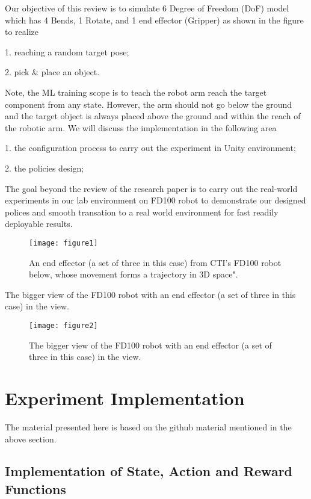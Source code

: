\documentclass[conference]{IEEEtran}
\begin{document}
Our objective of this review is to simulate 
6 Degree of Freedom (DoF) model which has 
4 Bends, 1 Rotate, and 1 end effector (Gripper)
as shown in the figure to realize 

1. reaching a random target pose; 

2. pick \& place an object. 

Note, the ML training scope is to teach the robot arm reach 
the target component from any state. However, the arm should 
not go below the ground and the target object is always 
placed above the ground and within the reach of the robotic 
arm. We will discuss the implementation in the following area

1. the configuration process to carry out the 
experiment in Unity environment; 

2. the policies design;  

The goal beyond the review of the research paper
is to carry out 
the real-world experiments in our lab environment on 
FD100 robot to demonstrate our designed polices and 
smooth transation to a real world environment for fast 
readily deployable results. 
\begin{figure}[H] 
\centering
\texttt{[image: figure1]}  
\caption{An end effector 
(a set of three in this case) from CTI's FD100 robot below, whose
movement forms a trajectory in 3D space". }
\label{fig1} 
\end{figure} 
 
The bigger view of the FD100 robot with an end effector 
(a set of three in this case) in the view. 

\begin{figure}[H] 
\centering
\texttt{[image: figure2]} %
\caption{The bigger view of the FD100 robot with an end effector 
(a set of three in this case) in the view.}
\label{fig2} 
\end{figure}

\section{Experiment Implementation}

The material presented here is based on the github
material mentioned in the above section. 

\subsection{Implementation of State, Action and Reward Functions}
\end{document}
